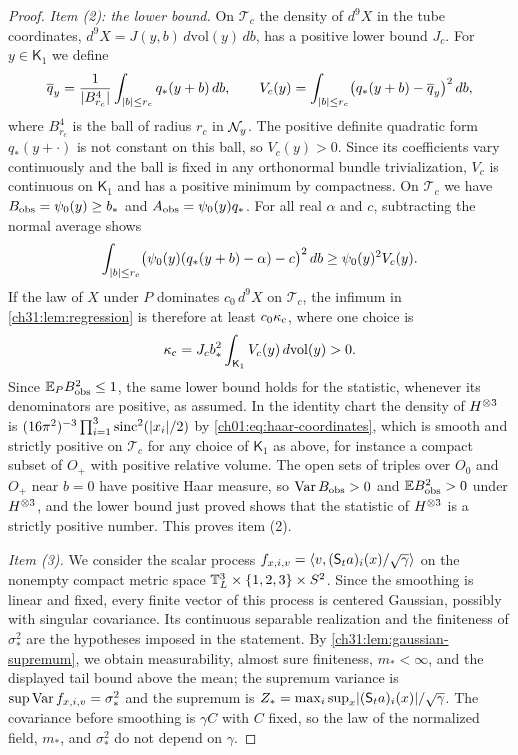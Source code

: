 \begin{proof}
\emph{Item (2): the lower bound.} On $\mathcal T_c$ the density of $d^9X$ in the tube coordinates, $d^9X=J(y,b)\,d\mathrm{vol}(y)\,db$, has a positive lower bound $J_c$. For $y\in\mathsf K_1$ we define
\[
 \overline q_y=\frac1{\lvert B^4_{r_c}\rvert}\int_{\lvert b\rvert\le r_c}q_*(y+b)\,db,\qquad V_c(y)=\int_{\lvert b\rvert\le r_c}\bigl(q_*(y+b)-\overline q_y\bigr)^2\,db,
\]
where $B^4_{r_c}$ is the ball of radius $r_c$ in $\mathcal N_{y}$. The positive definite quadratic form $q_*(y+\cdot)$ is not constant on this ball, so $V_c(y)>0$. Since its coefficients vary continuously and the ball is fixed in any orthonormal bundle trivialization, $V_c$ is continuous on $\mathsf K_1$ and has a positive minimum by compactness. On $\mathcal T_c$ we have $B_{\mathrm{obs}}=\psi_0(y)\ge b_*$ and $A_{\mathrm{obs}}=\psi_0(y)q_*$. For all real $\alpha$ and $c$, subtracting the normal average shows
\[
 \int_{\lvert b\rvert\le r_c}\bigl(\psi_0(y)(q_*(y+b)-\alpha)-c\bigr)^2\,db\ge\psi_0(y)^2V_c(y).
\]
If the law of $X$ under $P$ dominates $c_0\,d^9X$ on $\mathcal T_c$, the infimum in \cref{ch31:lem:regression} is therefore at least $c_0\kappa_{\rm c}$, where one choice is
\[
 \kappa_{\rm c}=J_cb_*^2\int_{\mathsf K_1}V_c(y)\,d\mathrm{vol}(y)>0.
\]
Since $\mathbb E_PB_{\mathrm{obs}}^2\le1$, the same lower bound holds for the statistic, whenever its denominators are positive, as assumed. In the identity chart the density of $H^{\otimes3}$ is $(16\pi^2)^{-3}\prod_{i=1}^3\operatorname{sinc}^2(\lvert x_i\rvert/2)$ by \eqref{ch01:eq:haar-coordinates}, which is smooth and strictly positive on $\mathcal T_c$ for any choice of $\mathsf K_1$ as above, for instance a compact subset of $O_+$ with positive relative volume. The open sets of triples over $O_0$ and $O_+$ near $b=0$ have positive Haar measure, so $\operatorname{Var}B_{\mathrm{obs}}>0$ and $\mathbb EB_{\mathrm{obs}}^2>0$ under $H^{\otimes3}$, and the lower bound just proved shows that the statistic of $H^{\otimes3}$ is a strictly positive number. This proves item (2).

\emph{Item (3).} We consider the scalar process $f_{x,i,v}=\langle v,(\mathsf S_ta)_i(x)/\sqrt\gamma\rangle$ on the nonempty compact metric space $\mathbb T_L^3\times\{1,2,3\}\times S^2$. Since the smoothing is linear and fixed, every finite vector of this process is centered Gaussian, possibly with singular covariance. Its continuous separable realization and the finiteness of $\sigma_*^2$ are the hypotheses imposed in the statement. By \cref{ch31:lem:gaussian-supremum}, we obtain measurability, almost sure finiteness, $m_*<\infty$, and the displayed tail bound above the mean; the supremum variance is $\sup\operatorname{Var} f_{x,i,v}=\sigma_*^2$ and the supremum is $Z_*=\max_i\sup_x\lvert (\mathsf S_ta)_i(x)\rvert/\sqrt\gamma$. The covariance before smoothing is $\gamma C$ with $C$ fixed, so the law of the normalized field, $m_*$, and $\sigma_*^2$ do not depend on $\gamma$.


\end{proof}
